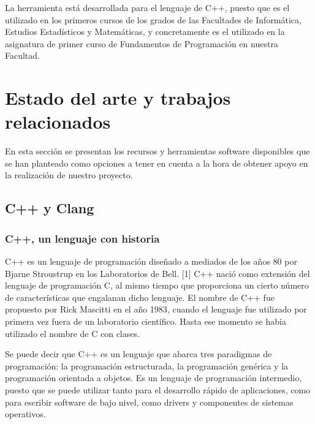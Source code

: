 La herramienta est\'a desarrollada para el lenguaje de C++, puesto que es el utilizado en los primeros cursos de los grados de las Facultades de Inform\'atica, Estudios Estad\'isticos y Matem\'aticas, y concretamente es el utilizado en la asignatura de primer curso de Fundamentos de Programaci\'on en nuestra Facultad.

\section{Estado del arte y trabajos relacionados}

En esta secci\'on se presentan los recursos y herramientas software disponibles que se han planteado como opciones a tener en cuenta a la hora de obtener apoyo en la realizaci\'on de nuestro proyecto.

\subsection{C++ y Clang}

\subsubsection*{C++, un lenguaje con historia}
\label{ap2:sec:c++}

C++ es un lenguaje de programaci\'on dise\~nado a mediados de los a\~nos 80 por Bjarne Stroustrup en los Laboratorios de Bell. [1] C++ naci\'o como extensi\'on del lenguaje de programaci\'on C, al mismo tiempo que proporciona un cierto n\'umero de caracter\'isticas que engalanan dicho lenguaje. El nombre de C++ fue propuesto por Rick Mascitti en el a\~no 1983, cuando el lenguaje fue utilizado por primera vez fuera de un laboratorio cient\'ifico. Hasta ese momento se hab\'ia utilizado el nombre de C con clases. 

Se puede decir que C++ es un lenguaje que abarca tres paradigmas de programaci\'on: la programaci\'on estructurada, la programaci\'on gen\'erica y la programaci\'on orientada a objetos. Es un lenguaje de programaci\'on intermedio, puesto que se puede utilizar tanto para el desarrollo r\'apido de aplicaciones, como para escribir software de bajo nivel, como drivers y componentes de sistemas operativos.

